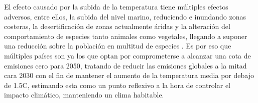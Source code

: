 El efecto causado por la subida de la temperatura tiene múltiples efectos adversos, entre ellos, la subida del nivel marino, reduciendo e inundando zonas costeras, la desertificación de zonas actualmente áridas y la alteración del comportamiento de especies tanto animales como vegetales, llegando a suponer una reducción sobre la población en multitud de especies \cite{arnell2019global} \cite{new2011four}. Es por eso que múltiples países son ya los que optan por comprometerse a alcanzar una cota de emisiones cero para 2050, tratando de reducir las emisiones globales a la mitad cara 2030 con el fin de mantener el aumento de la temperatura media por debajo de 1.5\textdegree C, estimando esta como un punto reflexivo a la hora de controlar el impacto climático, manteniendo un clima habitable.





